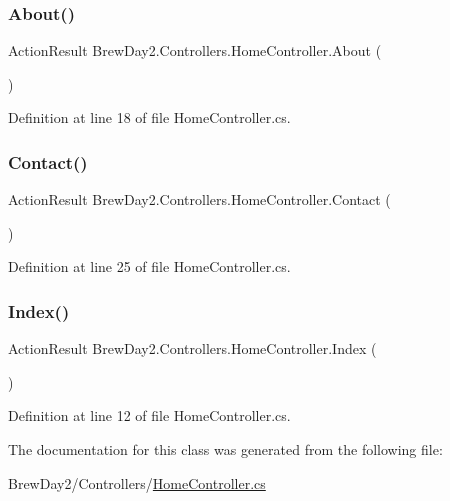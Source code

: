 \subsubsection{\texorpdfstring{About()}{About()}}
{\footnotesize\ttfamily Action\+Result Brew\+Day2.\+Controllers.\+Home\+Controller.\+About (\begin{DoxyParamCaption}{ }\end{DoxyParamCaption})}



Definition at line 18 of file Home\+Controller.\+cs.

\mbox{\label{class_brew_day2_1_1_controllers_1_1_home_controller_a739e94a75fb382a8d53990c7ca458ff8}} 
\subsubsection{\texorpdfstring{Contact()}{Contact()}}
{\footnotesize\ttfamily Action\+Result Brew\+Day2.\+Controllers.\+Home\+Controller.\+Contact (\begin{DoxyParamCaption}{ }\end{DoxyParamCaption})}



Definition at line 25 of file Home\+Controller.\+cs.

\mbox{\label{class_brew_day2_1_1_controllers_1_1_home_controller_afc978e14b8c2291b08bea04a6364b021}} 
\subsubsection{\texorpdfstring{Index()}{Index()}}
{\footnotesize\ttfamily Action\+Result Brew\+Day2.\+Controllers.\+Home\+Controller.\+Index (\begin{DoxyParamCaption}{ }\end{DoxyParamCaption})}



Definition at line 12 of file Home\+Controller.\+cs.



The documentation for this class was generated from the following file\+:\begin{DoxyCompactItemize}
\item 
Brew\+Day2/\+Controllers/\mbox{\hyperlink{_home_controller_8cs}{Home\+Controller.\+cs}}\end{DoxyCompactItemize}
